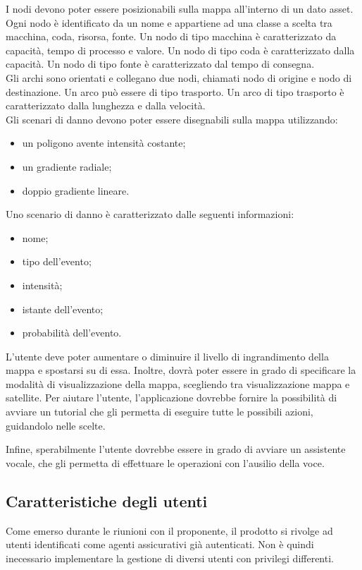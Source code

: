 	I nodi devono poter essere posizionabili sulla mappa all'interno di un dato asset. Ogni nodo è identificato da un nome e appartiene ad una classe a scelta tra macchina, coda, risorsa, fonte. Un nodo di tipo macchina è caratterizzato da capacità, tempo di processo e valore. Un nodo di tipo coda è caratterizzato dalla capacità. Un nodo di tipo fonte è caratterizzato dal tempo di consegna.\\
	Gli archi sono orientati e collegano due nodi, chiamati nodo di origine e nodo di destinazione. Un arco può essere di tipo trasporto. Un arco di tipo trasporto è caratterizzato dalla lunghezza e dalla velocità. \\
	Gli scenari di danno devono poter essere disegnabili sulla mappa utilizzando:
	\begin{itemize}
			\item un poligono avente intensità costante;
			\item un gradiente radiale;
			\item doppio gradiente lineare.
	\end{itemize}
	Uno scenario di danno è caratterizzato dalle seguenti informazioni:
		\begin{itemize}
		\item nome;
		\item tipo dell'evento;
		\item intensità;
		\item istante dell'evento;
		\item probabilità dell'evento.
		\end{itemize}
	L'utente deve poter aumentare o diminuire il livello di ingrandimento della mappa e spostarsi su di essa. Inoltre, dovrà poter essere in grado di specificare la modalità di visualizzazione della mappa, scegliendo tra visualizzazione mappa e satellite.
	Per aiutare l'utente, l'applicazione dovrebbe fornire la possibilità di avviare un tutorial che gli permetta di eseguire tutte le possibili azioni, guidandolo nelle scelte.
	
		
	Infine, sperabilmente l'utente dovrebbe essere in grado di avviare un assistente vocale, che gli permetta di effettuare le operazioni con l'ausilio della voce.
\subsection{Caratteristiche degli utenti}
Come emerso durante le riunioni con il proponente, il prodotto si rivolge ad utenti identificati come agenti assicurativi già autenticati. Non è quindi inecessario implementare la gestione di diversi utenti con privilegi differenti.
